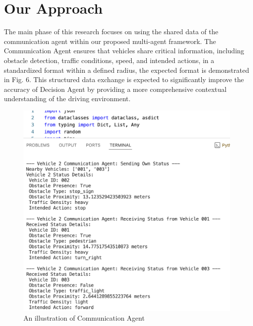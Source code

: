\documentclass[conference]{IEEEtran}
\begin{document}
 


\section{Our Approach}
The main phase of this research focuses on using the shared data of the communication agent within our proposed multi-agent framework. The Communication Agent ensures that vehicles share critical information, including obstacle detection, traffic conditions, speed, and intended actions, in a standardized format within a defined radius, the expected format is demonstrated in Fig. 6. This structured data exchange is expected to significantly improve the accuracy of Decision Agent by providing a more comprehensive contextual understanding of the driving environment.
 \begin{figure}[h]
     \centering
     \includegraphics[width=\linewidth]{Fig/Commu_Agent.png}
     \caption{An illustration of Communication Agent}
     \label{fig:enter-label}
 \end{figure}
\end{document}

